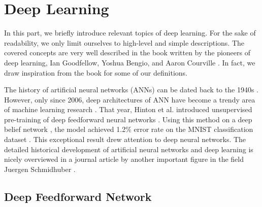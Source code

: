 \section{Deep Learning}\label{deep_learning_chapter}


In this part, we briefly introduce relevant topics of deep learning. For the sake of readability, we only limit ourselves to high-level and simple descriptions. The covered concepts are very well described in the book written by the pioneers of deep learning, Ian Goodfellow, Yoshua Bengio, and Aaron Courville \cite{Goodfellow-et-al-2016}. In fact, we draw inspiration from the book for some of our definitions.

The history of artificial neural networks (ANNs) can be dated back to the 1940s \cite{McCulloch_1943}. However, only since 2006, deep architectures of ANN have become a trendy area of machine learning research \cite{DBLP:journals/corr/Schmidhuber14}. That year, Hinton et al. introduced unsupervised pre-training of deep feedforward neural networks \cite{hinton2006reducing}. Using this method on a deep belief network \cite{DBN}, the model achieved 1.2\% error rate on the MNIST classification dataset \cite{hinton2006fast, mnist}. This exceptional result drew attention to deep neural networks. The detailed historical development of artificial neural networks and deep learning is nicely overviewed in a journal article by another important figure in the field Juergen Schmidhuber 
\cite{DBLP:journals/corr/Schmidhuber14}.

\subsection{Deep Feedforward Network}
    

